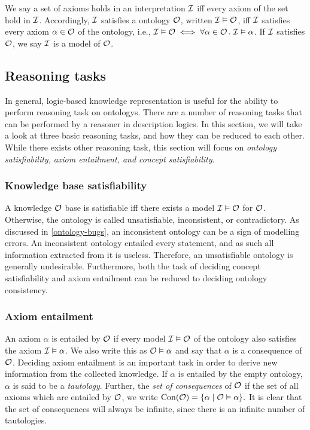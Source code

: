 We say a set of axioms holds in an interpretation $\mathcal{I}$ iff every axiom of the set hold in $\mathcal{I}$. Accordingly, $\mathcal{I}$ satisfies a ontology $\mathcal{O}$, written $\mathcal{I} \vDash \mathcal{O}$, iff $\mathcal{I}$ satisfies every axiom $\alpha \in \mathcal{O}$ of the ontology, i.e., $\mathcal{I} \vDash \mathcal{O} \iff \forall \alpha \in \mathcal{O} \, . \; \mathcal{I} \vDash \alpha$. If $\mathcal{I}$ satisfies $\mathcal{O}$, we say $\mathcal{I}$ is a model of $\mathcal{O}$.

\subsection{Reasoning tasks} \label{reasoning-tasks}

In general, logic-based knowledge representation is useful for the ability to perform reasoning task on ontologys. There are a number of reasoning tasks that can be performed by a reasoner in description logics. In this section, we will take a look at three basic reasoning tasks, and how they can be reduced to each other. While there exists other reasoning task, this section will focus on \emph{ontology satisfiability,} \emph{axiom entailment, and concept satisfiability}.

\subsubsection{Knowledge base satisfiability} \label{knowledge-base-satisfiability}

A knowledge $\mathcal{O}$ base is satisfiable iff there exists a model $\mathcal{I} \vDash \mathcal{O}$ for $\mathcal{O}$. Otherwise, the ontology is called unsatisfiable, inconsistent, or contradictory. As discussed in \cref{ontology-bugs}, an inconsistent ontology can be a sign of modelling errors. An inconsistent ontology entailed every statement, and as such all information extracted from it is useless. Therefore, an unsatisfiable ontology is generally undesirable. Furthermore, both the task of deciding concept satisfiability and axiom entailment can be reduced to deciding ontology consistency.

\subsubsection{Axiom entailment} \label{axiom-entailment}

An axiom $\alpha$ is entailed by $\mathcal{O}$ if every model $\mathcal{I} \vDash \mathcal{O}$ of the ontology also satisfies the axiom $\mathcal{I} \vDash \alpha$. We also write this as $\mathcal{O} \vDash \alpha$ and say that $\alpha$ is a consequence of $\mathcal{O}$. Deciding axiom entailment is an important task in order to derive new information from the collected knowledge. If $\alpha$ is entailed by the empty ontology, $\alpha$ is said to be a \emph{tautology}. Further, the \emph{set of consequences} of $\mathcal{O}$ if the set of all axioms which are entailed by $\mathcal{O}$, we write $\mathrm{Con}(\mathcal{O}) = \{ \alpha \mid \mathcal{O} \vDash \alpha \}.$ It is clear that the set of consequences will always be infinite, since there is an infinite number of tautologies.

